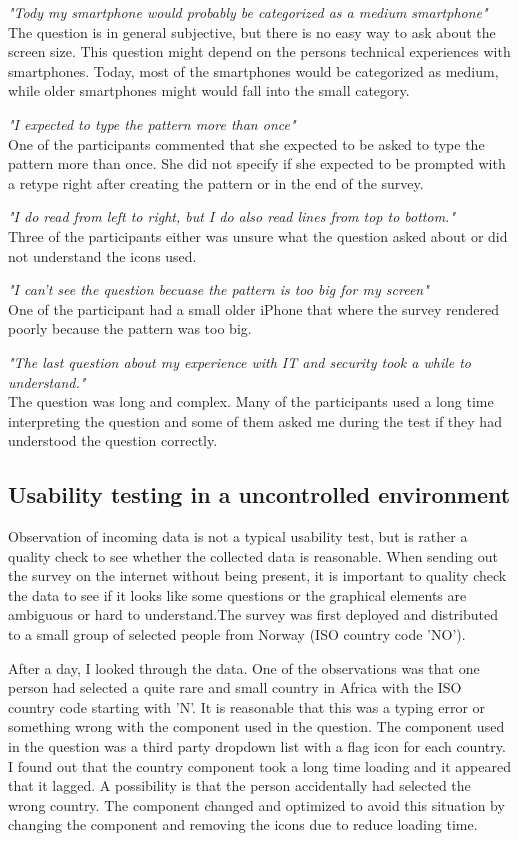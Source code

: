     {\it "Tody my smartphone would probably be categorized as a medium smartphone"}\\The question is in general subjective, but there is no easy way to ask about the screen size. This question might depend on the persons technical experiences with smartphones. Today, most of the smartphones would be categorized as medium, while older smartphones might would fall into the small category.
      
    {\it "I expected to type the pattern more than once"}\\ 
    One of the participants commented that she expected to be asked to type the pattern more than once. She did not specify if she expected to be prompted with a retype right after creating the pattern or in the end of the survey.
      
    {\it "I do read from left to right, but I do also read lines from top to bottom."}\\ 
    Three of the participants either was unsure what the question asked about or did not understand the icons used. 
      
    {\it "I can't see the question becuase the pattern is too big for my screen"}\\
    One of the participant had a small older iPhone that where the survey rendered poorly because the pattern was too big. 
      
    {\it "The last question about my experience with IT and security took a while to understand."}\\ 
    The question was long and complex. Many of the participants used a long time interpreting the question and some of them asked me during the test if they had understood the question correctly.

    \subsection{Usability testing in a uncontrolled environment}
    Observation of incoming data is not a typical usability test, but is rather a quality check to see whether the collected data is reasonable. When sending out the survey on the internet without being present, it is important to quality check the data to see if it looks like some questions or the graphical elements are ambiguous or hard to understand.The survey was first deployed and distributed to a small group of selected people from Norway (ISO country code 'NO').

    After a day, I looked through the data. One of the observations was that one person had selected a quite rare and small country in Africa with the ISO country code starting with 'N'. It is reasonable that this was a typing error or something wrong with the component used in the question. The component used in the question was a third party dropdown list with a flag icon for each country. I found out that the country component took a long time loading and it appeared that it lagged. A possibility is that the person accidentally had selected the wrong country. The component changed and optimized to avoid this situation by changing the component and removing the icons due to reduce loading time.

